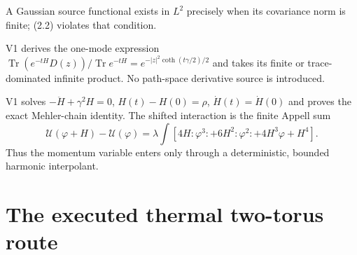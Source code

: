 \documentclass[11pt,a4paper]{article}
\newcommand{\U}{\mathcal U}
\newcommand{\Tr}{\operatorname{Tr}}
\begin{document}

\Because A Gaussian source functional exists in $L^2$ precisely when its covariance
norm is finite; (2.2) violates that condition.

\QedStep



\Because V1 derives the one-mode expression
$\Tr(e^{-tH}D(z))/\Tr e^{-tH}=e^{-|z|^2\coth(t\gamma/2)/2}$ and takes its finite or
trace-dominated infinite product.  No path-space derivative source is introduced.


\Because V1 solves
$-\ddot H+\gamma^2H=0$, $H(t)-H(0)=\rho$,
$\dot H(t)=\dot H(0)$ and proves the exact Mehler-chain identity.  The shifted
interaction is the finite Appell sum
\[
 \U(\varphi+H)-\U(\varphi)
 =\lambda\int[4H{:}\varphi^3{:}+6H^2{:}\varphi^2{:}
 +4H^3\varphi+H^4].
\tag{2.3}
\]
Thus the momentum variable enters only through a deterministic, bounded harmonic
interpolant.

\QedStep

\section{The executed thermal two-torus route}

\end{document}
